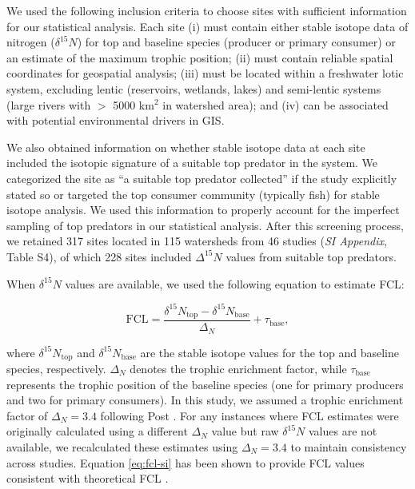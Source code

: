 \documentclass[11pt, class=article, crop=false]{standalone}
\theoremstyle{definition}
\begin{document}
We used the following inclusion criteria to choose sites with sufficient information for our statistical analysis.
Each site (i) must contain either stable isotope data of nitrogen ($\delta^{15}N$) for top and baseline species (producer or primary consumer) or an estimate of the maximum trophic position; 
(ii) must contain reliable spatial coordinates for geospatial analysis; 
(iii) must be located within a freshwater lotic system, excluding lentic (reservoirs, wetlands, lakes) and semi-lentic systems (large rivers with $>$ 5000 km$^2$ in watershed area); and (iv) can be associated with potential environmental drivers in GIS.

We also obtained information on whether stable isotope data at each site included the isotopic signature of a suitable top predator in the system.
We categorized the site as ``a suitable top predator collected'' if the study explicitly stated so or targeted the top consumer community (typically fish) for stable isotope analysis.
We used this information to properly account for the imperfect sampling of top predators in our statistical analysis.
After this screening process, we retained 317 sites located in 115 watersheds from 46 studies (\textit{SI Appendix}, Table S4), of which 228 sites included $\Delta^{15}N$ values from suitable top predators. 

When $\delta^{15}N$ values are available, we used the following equation to estimate FCL:

\begin{equation}
    \mbox{FCL} = \frac{\delta^{15}N_{\text{top}} - \delta^{15}N_{\text{base}}}{\Delta_N} + \tau_{\text{base}},
    \label{eq:fcl-si}
\end{equation}

where $\delta^{15}N_{\text{top}}$ and $\delta^{15}N_{\text{base}}$ are the stable isotope values for the top and baseline species, respectively.
$\Delta_{N}$ denotes the trophic enrichment factor, while $\tau_{\text{base}}$ represents the trophic position of the baseline species (one for primary producers and two for primary consumers). 
In this study, we assumed a trophic enrichment factor of $\Delta_{N} = 3.4$ following Post \citep{post_using_2002}.
For any instances where FCL estimates were originally calculated using a different $\Delta_{N}$ value but raw $\delta^{15}N$ values are not available, we recalculated these estimates using $\Delta_{N} = 3.4$ to maintain consistency across studies.
Equation \ref{eq:fcl-si} has been shown to provide FCL values consistent with theoretical FCL \citep{vagnon_integrating_2026}.
\end{document}
